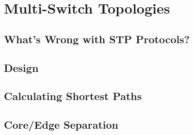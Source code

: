 
\chapter{Multi-Switch Topologies}
 \label{multitswitch_topologies}

\section{What's Wrong with STP Protocols?}
 \label{multitswitch_topologies:whats_wrong}

\section{Design}

\section{Calculating Shortest Paths}

\section{Core/Edge Separation}


